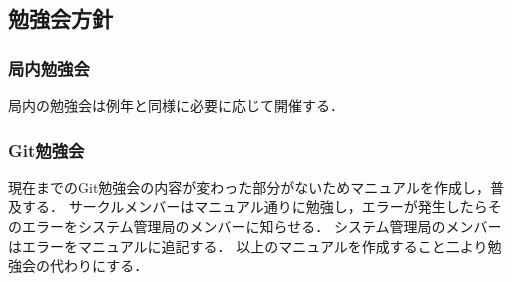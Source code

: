 \subsection*{勉強会方針}



\subsubsection*{局内勉強会}
局内の勉強会は例年と同様に必要に応じて開催する．
\subsubsection*{Git勉強会}
現在までのGit勉強会の内容が変わった部分がないためマニュアルを作成し，普及する．
サークルメンバーはマニュアル通りに勉強し，エラーが発生したらそのエラーをシステム管理局のメンバーに知らせる．
システム管理局のメンバーはエラーをマニュアルに追記する．
以上のマニュアルを作成すること二より勉強会の代わりにする．
